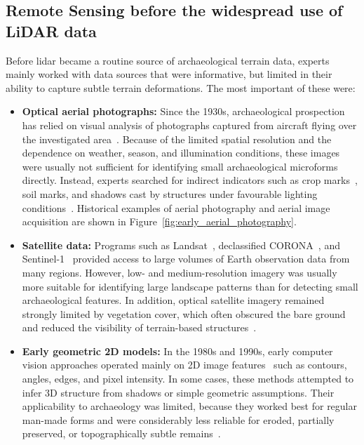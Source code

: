 \subsection{Remote Sensing before the widespread use of LiDAR data}
Before \gls{lidar} became a routine source of archaeological terrain data, experts mainly worked with data sources that were informative, but limited in their ability to capture subtle terrain deformations. The most important of these were:
\begin{itemize}
    \item \textbf{Optical aerial photographs:} Since the 1930s, archaeological prospection has relied on visual analysis of photographs captured from aircraft flying over the investigated area~\cite{cowley_what_2016}. Because of the limited spatial resolution and the dependence on weather, season, and illumination conditions, these images were usually not sufficient for identifying small archaeological microforms directly. Instead, experts searched for indirect indicators such as crop marks~\cite{cowley_what_2016}, soil marks, and shadows cast by structures under favourable lighting conditions~\cite{HUERTAS1988131,liow_use_1990}. Historical examples of aerial photography and aerial image acquisition are shown in Figure~\ref{fig:early_aerial_photography}.

    \item \textbf{Satellite data:} Programs such as Landsat~\cite{wulder_fifty_2022,williams_landsat_nodate}, declassified CORONA~\cite{ur_corona_2003,altmaier_digital_2002}, and Sentinel-1~\cite{michenot_identification_2024} provided access to large volumes of Earth observation data from many regions. However, low- and medium-resolution imagery was usually more suitable for identifying large landscape patterns than for detecting small archaeological features. In addition, optical satellite imagery remained strongly limited by vegetation cover, which often obscured the bare ground and reduced the visibility of terrain-based structures~\cite{thompson_detecting_2020,michenot_identification_2024}.

    \item \textbf{Early geometric 2D models:} In the 1980s and 1990s, early computer vision approaches operated mainly on 2D image features~\cite{griffiths_improving_2019} such as contours, angles, edges, and pixel intensity. In some cases, these methods attempted to infer 3D structure from shadows or simple geometric assumptions. Their applicability to archaeology was limited, because they worked best for regular man-made forms and were considerably less reliable for eroded, partially preserved, or topographically subtle remains~\cite{HUERTAS1988131,liow_use_1990}.
\end{itemize}

